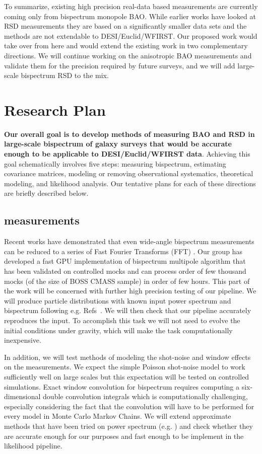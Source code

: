 To summarize, existing high precision real-data based measurements are
currently coming only from bispectrum monopole BAO. While earlier works have
looked at RSD measurements they are based on a significantly smaller data sets
and the methods are not extendable to DESI/Euclid/WFIRST. Our proposed work
would take over from here and would extend the existing work in two
complementary directions. We will continue working on the anisotropic BAO
measurements and validate them for the precision required by future surveys,
and we will add large-scale bispectrum RSD to the mix.

\section{Research Plan}

\textbf{Our overall goal is to develop methods of measuring BAO and RSD in
large-scale bispectrum of galaxy surveys that would be accurate enough to be
applicable to DESI/Euclid/WFIRST data}. Achieving this goal schematically
involves five steps: measuring bispectrum, estimating covariance matrices,
modeling or removing observational systematics, theoretical modeling, and
likelihood analysis. Our tentative plans for each of these directions are
briefly described below.

\subsection*{measurements}

Recent works have demonstrated that even wide-angle bispectrum measurements can
be reduced to a series of Fast Fourier Transforms (FFT)
\cite{2015PhRvD..92h3532S,2018arXiv180302132S}. Our group has developed a fast
GPU implementation of bispectrum multipole algorithm that has been validated on
controlled mocks and can process order of few thousand mocks (of the size of
BOSS CMASS sample) in order of few hours. This part of the work will be
concerned with further high precision testing of our pipeline. We will produce
particle distributions with known input power spectrum and bispectrum following
e.g. Refs~\cite{2012PhRvD..85h3002S,2012PhRvD..86l3524R,2010JCAP...10..022W}.
We will then check that our pipeline accurately reproduces the input. To
accomplish this task we will not need to evolve the initial conditions under
gravity, which will make the task computationally inexpensive. 

In addition, we will test methods of modeling the shot-noise and window effects
on the measurements. We expect the simple Poisson shot-noise model to work
sufficiently well on large scales but this expectation will be tested on
controlled simulations. Exact window convolution for bispectrum requires
computing a six-dimensional double convolution integrals which is
computationally challenging, especially considering the fact that the
convolution will have to be performed for every model in Monte Carlo Markov
Chains. We will extend approximate methods that have been tried on power
spectrum (e.g. \cite{2017MNRAS.464.3121W}) and check whether they are accurate
enough for our purposes and fast enough to be implement in the likelihood
pipeline. 

